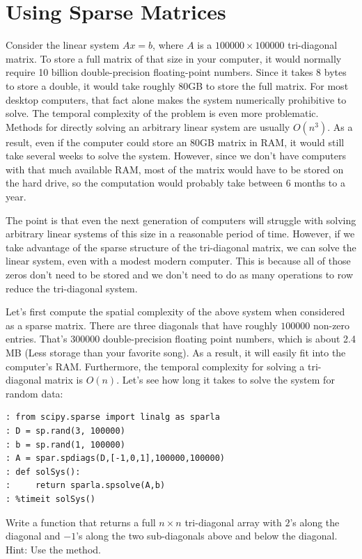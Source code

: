 \section*{Using Sparse Matrices}
Consider the linear system $A x = b$, where $A$ is a $100000\times 100000$ tri-diagonal matrix. 
To store a full matrix of that size in your computer, it would normally require 10
billion double-precision floating-point numbers.  Since it takes 8
bytes to store a double, it would take roughly 80GB to store the
full matrix.  For most desktop computers, that fact alone makes the
system numerically prohibitive to solve. 
The temporal complexity of the problem is even more problematic. 
Methods for directly solving an arbitrary linear system are usually $O(n^3)$.  
As a result, even if the computer could store an 80GB matrix in RAM, it
would still take several weeks to solve the system.  However, since
we don't have computers with that much available RAM, most of the
matrix would have to be stored on the hard drive, so the computation
would probably take between $6$ months to a year.

The point is that even the next generation of computers will
struggle with solving arbitrary linear systems of this size in a
reasonable period of time.  However, if we take advantage of the
sparse structure of the tri-diagonal matrix, we can solve the linear
system, even with a modest modern computer.  This is because all of
those zeros don't need to be stored and we don't need to do as many
operations to row reduce the tri-diagonal system.

Let's first compute the spatial complexity of the above system when
considered as a sparse matrix.  There are three diagonals that have
roughly $100000$ non-zero entries.  That's $300000$
double-precision floating point numbers, which is about 2.4 MB (Less
storage than your favorite song).  As a result, it will easily
fit into the computer's RAM.  Furthermore, the temporal complexity for solving
a tri-diagonal matrix is $O(n)$. Let's see how long it takes to
solve the system for random data:
\begin{lstlisting}
: from scipy.sparse import linalg as sparla
: D = sp.rand(3, 100000)
: b = sp.rand(1, 100000)
: A = spar.spdiags(D,[-1,0,1],100000,100000)
: def solSys():
:     return sparla.spsolve(A,b)
: %timeit solSys()
\end{lstlisting}

\begin{problem}
Write a function that returns a full $n\times n$
tri-diagonal array with $2$'s along the diagonal and $-1$'s along
the two sub-diagonals above and below the diagonal. 
Hint: Use the  method.
\label{prob:full_tridiag}
\end{problem}

